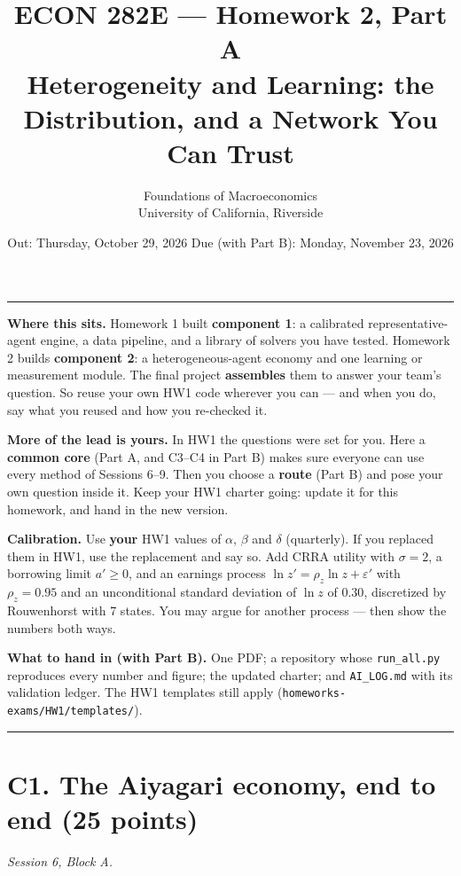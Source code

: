 \documentclass[11pt]{article}
\title{\vspace{-2em}\textbf{ECON 282E --- Homework 2, Part A}\\[2mm]
       \large Heterogeneity and Learning: the Distribution, and a Network You Can Trust}
\author{Foundations of Macroeconomics \\ University of California, Riverside}
\date{Out: Thursday, October 29, 2026 \quad\textbullet\quad Due (with Part B): Monday, November 23, 2026}
\begin{document}
\maketitle
\thispagestyle{empty}

\noindent\rule{\linewidth}{0.4pt}\par
\small
\textbf{Where this sits.} Homework 1 built \textbf{component 1}: a calibrated representative-agent
engine, a data pipeline, and a library of solvers you have tested. Homework 2 builds
\textbf{component 2}: a heterogeneous-agent economy and one learning or measurement module. The final
project \textbf{assembles} them to answer your team's question. So reuse your own HW1 code wherever
you can --- and when you do, say what you reused and how you re-checked it.

\textbf{More of the lead is yours.} In HW1 the questions were set for you. Here a \textbf{common core}
(Part A, and C3--C4 in Part B) makes sure everyone can use every method of Sessions 6--9. Then you
choose a \textbf{route} (Part B) and pose your own question inside it. Keep your HW1 charter going:
update it for this homework, and hand in the new version.

\textbf{Calibration.} Use \textbf{your} HW1 values of $\alpha$, $\beta$ and $\delta$ (quarterly). If
you replaced them in HW1, use the replacement and say so. Add CRRA utility with $\sigma=2$, a borrowing
limit $a'\ge0$, and an earnings process $\ln z'=\rho_z\ln z+\varepsilon'$ with $\rho_z=0.95$ and an
unconditional standard deviation of $\ln z$ of $0.30$, discretized by Rouwenhorst with 7 states. You
may argue for another process --- then show the numbers both ways.

\textbf{What to hand in (with Part B).} One PDF; a repository whose \texttt{run\_all.py} reproduces
every number and figure; the updated charter; and \texttt{AI\_LOG.md} with its validation ledger.
The HW1 templates still apply (\texttt{homeworks-exams/HW1/templates/}).
\normalsize\par
\noindent\rule{\linewidth}{0.4pt}\par

\section*{C1. The Aiyagari economy, end to end (25 points)}
\emph{Session 6, Block A.}
\end{document}
